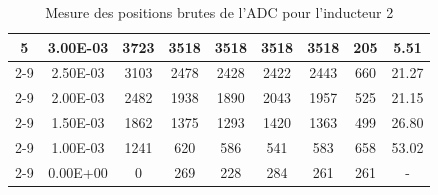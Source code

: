 \begin{table}[H]
{\begin{tabular}{|c|c|c|c|c|c|c|c|c|}
            \multirow{6}{*}{5} & 3.00E-03         & 3723      & 3518                                                       & 3518                                                      & 3518                                                      & 3518    & 205    & 5.51                                                               \\ \cline{2-9}
                               & 2.50E-03         & 3103      & 2478                                                       & 2428                                                      & 2422                                                      & 2443    & 660    & 21.27                                                              \\ \cline{2-9}
                               & 2.00E-03         & 2482      & 1938                                                       & 1890                                                      & 2043                                                      & 1957    & 525    & 21.15                                                              \\ \cline{2-9}
                               & 1.50E-03         & 1862      & 1375                                                       & 1293                                                      & 1420                                                      & 1363    & 499    & 26.80                                                              \\ \cline{2-9}
                               & 1.00E-03         & 1241      & 620                                                        & 586                                                       & 541                                                       & 583     & 658    & 53.02                                                              \\ \cline{2-9}
                               & 0.00E+00         & 0         & 269                                                        & 228                                                       & 284                                                       & 261     & 261    & -                                                                  \\ \hline
        \end{tabular}%
    }
    \caption{Mesure des positions brutes de l'ADC pour l'inducteur 2}
    \label{tab:adc_brut_inducteur2}
\end{table}

